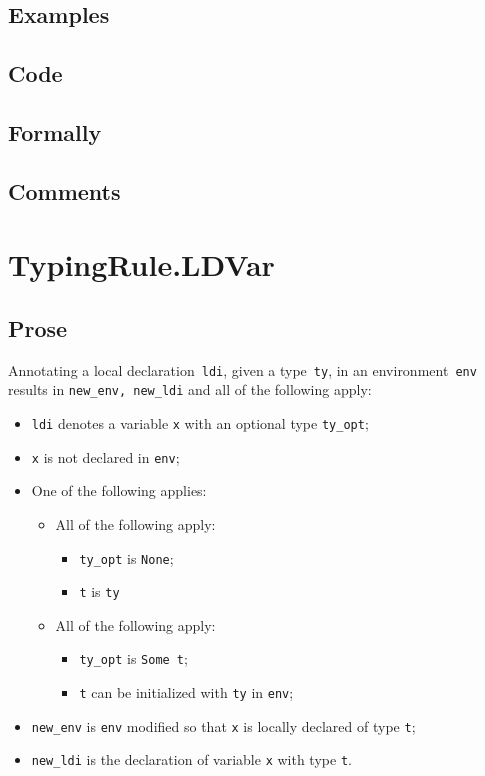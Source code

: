 \documentclass{book}
\begin{document}
  \subsection{Examples}

  \subsection{Code}

  \subsection{Formally}

  \subsection{Comments}

\section{TypingRule.LDVar \label{sec:TypingRule.LDVar}}

  \subsection{Prose}
    Annotating a local declaration~\texttt{ldi}, given a type~\texttt{ty}, in
an environment~\texttt{env} results in \texttt{new\_env, new\_ldi} and all of
the following apply:
   \begin{itemize}
   \item \texttt{ldi} denotes a variable \texttt{x} with an optional type \texttt{ty\_opt};
   \item \texttt{x} is not declared in \texttt{env};
   \item One of the following applies:
     \begin{itemize}
     \item All of the following apply:
       \begin{itemize}
       \item \texttt{ty\_opt} is \texttt{None};
       \item \texttt{t} is \texttt{ty}
       \end{itemize}
     \item All of the following apply:
       \begin{itemize}
       \item \texttt{ty\_opt} is \texttt{Some t};
       \item \texttt{t} can be initialized with \texttt{ty} in \texttt{env};
       \end{itemize}
     \end{itemize}
   \item \texttt{new\_env} is \texttt{env} modified so that \texttt{x} is locally declared of type \texttt{t};
   \item \texttt{new\_ldi} is the declaration of variable \texttt{x} with type \texttt{t}.
   \end{itemize}
\end{document}
